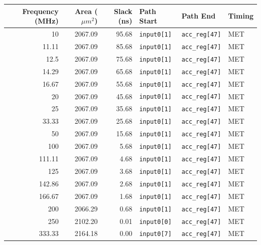 \documentclass[a4paper,11pt]{article}
\begin{document}
\begin{table}[htbp]
    \centering
    \scriptsize
    \begin{tabular}{r r r l l l}
        \toprule
        \textbf{Frequency (MHz)} &
        \textbf{Area ($\mu m^2$)} &
        \textbf{Slack (ns)} &
        \textbf{Path Start} &
        \textbf{Path End} &
        \textbf{Timing} \\
        \midrule
        10      & 2067.09 & 95.68  & \texttt{input0[1]}  & \texttt{acc\_reg[47]} & MET \\
        11.11   & 2067.09 & 85.68  & \texttt{input0[1]}  & \texttt{acc\_reg[47]} & MET \\
        12.5    & 2067.09 & 75.68  & \texttt{input0[1]}  & \texttt{acc\_reg[47]} & MET \\
        14.29   & 2067.09 & 65.68  & \texttt{input0[1]}  & \texttt{acc\_reg[47]} & MET \\
        16.67   & 2067.09 & 55.68  & \texttt{input0[1]}  & \texttt{acc\_reg[47]} & MET \\
        20      & 2067.09 & 45.68  & \texttt{input0[1]}  & \texttt{acc\_reg[47]} & MET \\
        25      & 2067.09 & 35.68  & \texttt{input0[1]}  & \texttt{acc\_reg[47]} & MET \\
        33.33   & 2067.09 & 25.68  & \texttt{input0[1]}  & \texttt{acc\_reg[47]} & MET \\
        50      & 2067.09 & 15.68  & \texttt{input0[1]}  & \texttt{acc\_reg[47]} & MET \\
        100     & 2067.09 & 5.68   & \texttt{input0[1]}  & \texttt{acc\_reg[47]} & MET \\
        111.11  & 2067.09 & 4.68   & \texttt{input0[1]}  & \texttt{acc\_reg[47]} & MET \\
        125     & 2067.09 & 3.68   & \texttt{input0[1]}  & \texttt{acc\_reg[47]} & MET \\
        142.86  & 2067.09 & 2.68   & \texttt{input0[1]}  & \texttt{acc\_reg[47]} & MET \\
        166.67  & 2067.09 & 1.68   & \texttt{input0[1]}  & \texttt{acc\_reg[47]} & MET \\
        200     & 2066.29 & 0.68   & \texttt{input0[1]}  & \texttt{acc\_reg[47]} & MET \\
        250     & 2102.20 & 0.01   & \texttt{input0[0]}  & \texttt{acc\_reg[47]} & MET \\
        333.33  & 2164.18 & 0.00   & \texttt{input0[7]}  & \texttt{acc\_reg[47]} & MET \\

\end{tabular}
\end{table}
\end{document}
